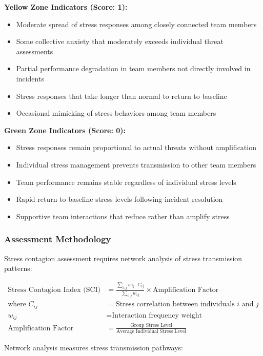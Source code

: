 \documentclass[11pt,a4paper]{article}
\begin{document}
\textbf{Yellow Zone Indicators (Score: 1):}
\begin{itemize}
\item Moderate spread of stress responses among closely connected team members
\item Some collective anxiety that moderately exceeds individual threat assessments
\item Partial performance degradation in team members not directly involved in incidents
\item Stress responses that take longer than normal to return to baseline
\item Occasional mimicking of stress behaviors among team members
\end{itemize}

\textbf{Green Zone Indicators (Score: 0):}
\begin{itemize}
\item Stress responses remain proportional to actual threats without amplification
\item Individual stress management prevents transmission to other team members
\item Team performance remains stable regardless of individual stress levels
\item Rapid return to baseline stress levels following incident resolution
\item Supportive team interactions that reduce rather than amplify stress
\end{itemize}

\subsubsection{Assessment Methodology}

Stress contagion assessment requires network analysis of stress transmission patterns:

\begin{align}
\text{Stress Contagion Index (SCI)} &= \frac{\sum_{i,j} w_{ij} \cdot C_{ij}}{\sum_{i,j} w_{ij}} \times \text{Amplification Factor} \\
\text{where } C_{ij} &= \text{Stress correlation between individuals } i \text{ and } j \\
w_{ij} &= \text{Interaction frequency weight} \\
\text{Amplification Factor} &= \frac{\text{Group Stress Level}}{\text{Average Individual Stress Level}}
\end{align}

Network analysis measures stress transmission pathways:
\end{document}
